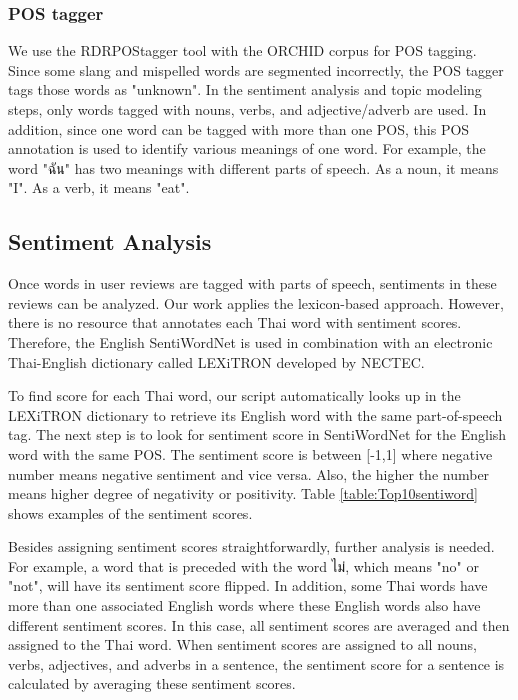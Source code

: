 \subsubsection{POS tagger}

We use the RDRPOStagger tool\cite{RDRPOSTagger} with the ORCHID corpus\cite{ORCHID} for POS tagging. Since some slang and mispelled words are segmented incorrectly, the POS tagger tags those words as "unknown". In the sentiment analysis and topic modeling steps, only words tagged with nouns, verbs, and adjective/adverb are used. In addition, since one word can be tagged with more than one POS, this POS annotation is used to identify various meanings of one word. For example, the word "{ฉัน}" has two meanings with different parts of speech. As a noun, it means "I". As a verb, it means "eat".

\subsection{Sentiment Analysis}
Once words in user reviews are tagged with parts of speech, sentiments in these reviews can be analyzed. Our work applies the lexicon-based approach. However, there is no resource that annotates each Thai word with sentiment scores. Therefore, the English SentiWordNet \cite{SentiWordNet} is used in combination with an electronic Thai-English dictionary called LEXiTRON \cite{LEXiTRON} developed by NECTEC.

To find score for each Thai word, our script automatically looks up in the LEXiTRON dictionary to retrieve its English word with the same part-of-speech tag. The next step is to look for sentiment score in SentiWordNet for the English word with the same POS. The sentiment score is between [-1,1] where negative number means negative sentiment and vice versa. Also, the higher the number means higher degree of negativity or positivity. Table \ref{table:Top10sentiword} shows examples of the sentiment scores. 

Besides assigning sentiment scores straightforwardly, further analysis is needed. For example, 
a word that is preceded with the word {ไม่}, which means "no" or "not", will have its sentiment score flipped. In addition, some Thai words have more than one associated English words where these English words also have different sentiment scores. In this case, all sentiment scores are  averaged and then assigned to the Thai word. When sentiment scores are assigned to all nouns, verbs, adjectives, and adverbs in a sentence, the sentiment score for a sentence is calculated by averaging these sentiment scores.

